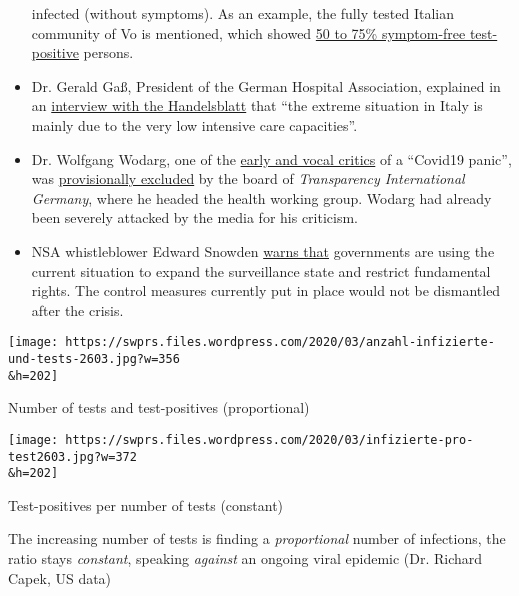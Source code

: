 \begin{itemize}
  infected (without symptoms). As an example, the fully tested Italian
  community of Vo is mentioned, which showed
  \href{https://www.repubblica.it/salute/medicina-e-ricerca/2020/03/16/news/coronavirus_studio_il_50-75_dei_casi_a_vo_sono_asintomatici_e_molto_contagiosi-251474302/}{50
  to 75\% symptom-free test-positive} persons.
\item
  Dr. Gerald Gaß, President of the German Hospital Association,
  explained in an
  \href{https://www.handelsblatt.com/politik/deutschland/coronakrise-deutsche-krankenhausgesellschaft-wir-sind-besser-vorbereitet-als-italien/25651268.html}{interview
  with the Handelsblatt} that ``the extreme situation in Italy is mainly
  due to the very low intensive care capacities''.
\item
  Dr. Wolfgang Wodarg, one of the
  \href{https://www.youtube.com/watch?v=p_AyuhbnPOI}{early and vocal
  critics} of a ``Covid19 panic'', was
  \href{https://www.transparency.de/aktuelles/detail/article/in-eigener-sache-vorstand-beschliesst-ruhen-der-mitgliedschaft-von-wolfgang-wodarg-1/}{provisionally
  excluded} by the board of \emph{Transparency International Germany},
  where he headed the health working group. Wodarg had already been
  severely attacked by the media for his criticism.
\item
  NSA whistleblower Edward Snowden
  \href{https://www.cnet.com/news/snowden-warns-government-surveillance-amid-covid-19-could-be-long-lasting/}{warns
  that} governments are using the current situation to expand the
  surveillance state and restrict fundamental rights. The control
  measures currently put in place would not be dismantled after the
  crisis.
\end{itemize}

\href{https://swprs.org/a-swiss-doctor-on-covid-19/anzahl-infizierte-und-tests-2603/}{}

\texttt{[image: https://swprs.files.wordpress.com/2020/03/anzahl-infizierte-und-tests-2603.jpg?w=356\\\&h=202]}

Number of tests and test-positives (proportional)

\href{https://swprs.org/covid-19-hinweis-ii/infizierte-pro-test2603/}{}

\texttt{[image: https://swprs.files.wordpress.com/2020/03/infizierte-pro-test2603.jpg?w=372\\\&h=202]}

Test-positives per number of tests (constant)

The increasing number of tests is finding a \emph{proportional} number
of infections, the ratio stays \emph{constant}, speaking \emph{against}
an ongoing viral epidemic (Dr. Richard Capek, US data)

